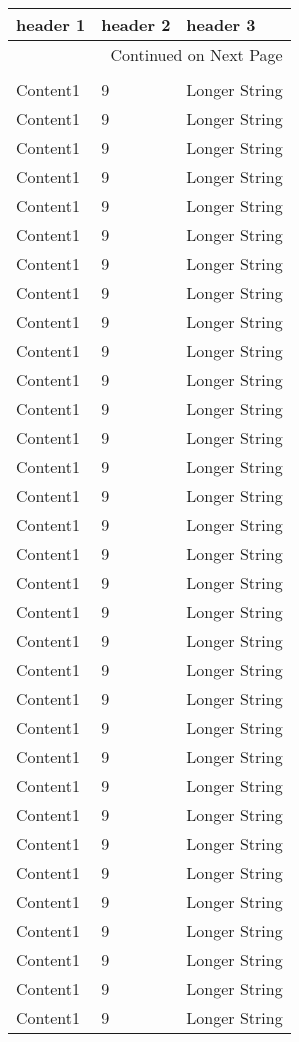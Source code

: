 \documentclass{article}%
\begin{document}
%
\normalsize%
\begin{longtable}{l l l}%
\hline%
header 1&header 2&header 3\\%
\hline%
\endhead%
\hline%
\multicolumn{3}{r}{Continued on Next Page}\\%
\hline%
\endfoot%
\hline%
\multicolumn{3}{r}{Not Continued on Next Page}\\%
\hline%
\endlastfoot%
Content1&9&Longer String\\%
Content1&9&Longer String\\%
Content1&9&Longer String\\%
Content1&9&Longer String\\%
Content1&9&Longer String\\%
Content1&9&Longer String\\%
Content1&9&Longer String\\%
Content1&9&Longer String\\%
Content1&9&Longer String\\%
Content1&9&Longer String\\%
Content1&9&Longer String\\%
Content1&9&Longer String\\%
Content1&9&Longer String\\%
Content1&9&Longer String\\%
Content1&9&Longer String\\%
Content1&9&Longer String\\%
Content1&9&Longer String\\%
Content1&9&Longer String\\%
Content1&9&Longer String\\%
Content1&9&Longer String\\%
Content1&9&Longer String\\%
Content1&9&Longer String\\%
Content1&9&Longer String\\%
Content1&9&Longer String\\%
Content1&9&Longer String\\%
Content1&9&Longer String\\%
Content1&9&Longer String\\%
Content1&9&Longer String\\%
Content1&9&Longer String\\%
Content1&9&Longer String\\%
Content1&9&Longer String\\%
Content1&9&Longer String\\%
Content1&9&Longer String\\%

\end{longtable}
\end{document}
